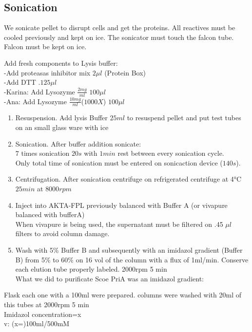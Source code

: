 \documentclass[12pt,twoside]{reedthesis}
\begin{document}
  \subsection{Sonication}\label{sonication}
  
  We sonicate pellet to disrupt cells and get the proteins. All reactives
  must be cooled previously and kept on ice. The sonicator must touch the
  falcon tube. Falcon must be kept on ice.
  
  Add fresh components to Lysis buffer:\\
  -Add proteasas inhibitor mix \(2\mu l\) (Protein Box)\\
  -Add DTT \(.1 25\mu l\)\\
  -Karina: Add Lysozyme \(\frac{2mg}{ml}\) \(100\mu l\)\\
  -Ana: Add Lysozyme \(\frac{10mg}{ml}\)(\(1000X\)) \(100\mu l\)
  
  \begin{enumerate}
  \def\labelenumi{\arabic{enumi}.}
  \setcounter{enumi}{1}
  \item
    Resuspension. Add lysis Buffer \(25ml\) to resuspend pellet and put
    test tubes on an small glass ware with ice
  \item
    Sonication. After buffer addition sonicate:\\
    \(7\) times sonication \(20s\) with \(1min\) rest between every
    sonication cycle.\\
    Only total time of sonication must be entered on sonicaction device
    (\(140s\)).
  \item
    Centrifugation. After sonication centrifuge on refrigerated centrifuge
    at 4°C \(25 min\) at \(8000 rpm\)
  \item
    Inject into AKTA-FPL previously balanced with Buffer A (or vivapure
    balanced with bufferA)\\
    When vivapure is being used, the supernatant must be filtered on .45
    \(\mu l\) filters to avoid column damage.
  \item
    Wash with 5\% Buffer B and subsequently with an imidazol gradient
    (Buffer B) from 5\% to 60\% on 16 vol of the column with a flux of
    1ml/min. Conserve each elution tube properly labeled. 2000rpm 5 min\\
    What we did to purificate Scoe PriA was an imidazol gradient:
  \end{enumerate}
  
  Flask each one with a 100ml were prepared. columns were washed with 20ml
  of this tubes at 2000rpm 5 min\\
  Imidazol concentration=x\\
  v: (x=)100ml/500mM
  
\end{document}
